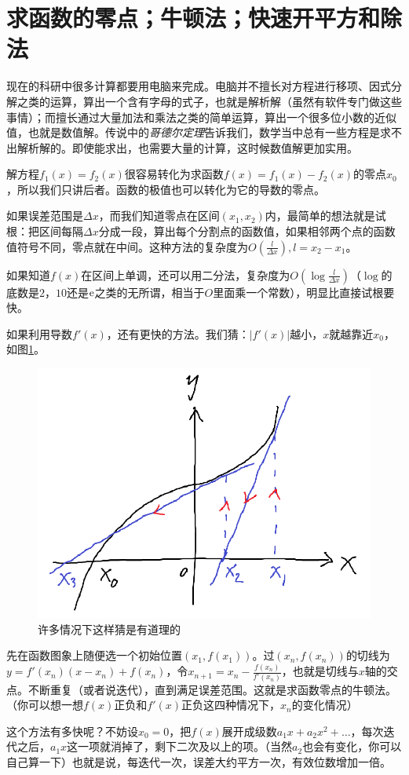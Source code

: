 \section{求函数的零点；牛顿法；快速开平方和除法}
现在的科研中很多计算都要用电脑来完成。电脑并不擅长对方程进行移项、因式分解之类的运算，算出一个含有字母的式子，也就是解析解（虽然有软件专门做这些事情）；而擅长通过大量加法和乘法之类的简单运算，算出一个很多位小数的近似值，也就是数值解。传说中的\emph{哥德尔定理}告诉我们，数学当中总有一些方程是求不出解析解的。即使能求出，也需要大量的计算，这时候数值解更加实用。

解方程$f_1(x)=f_2(x)$很容易转化为求函数$f(x)=f_1(x)-f_2(x)$的零点$x_0$，所以我们只讲后者。函数的极值也可以转化为它的导数的零点。

如果误差范围是$\Delta x$，而我们知道零点在区间$(x_1,x_2)$内，最简单的想法就是试根：把区间每隔$\Delta x$分成一段，算出每个分割点的函数值，如果相邻两个点的函数值符号不同，零点就在中间。这种方法的复杂度为$O(\frac{l}{\Delta x}),l=x_2-x_1$。

如果知道$f(x)$在区间上单调，还可以用二分法，复杂度为$O(\log \frac{l}{\Delta x})$（$\log$的底数是$2$，$10$还是$\mathrm{e}$之类的无所谓，相当于$O$里面乘一个常数），明显比直接试根要快。

如果利用导数$f'(x)$，还有更快的方法。我们猜：$|f'(x)|$越小，$x$就越靠近$x_0$，如图\ref{fig-newton-iter}。
\begin{figure}[htb]
\centering
\includegraphics[width=0.33\linewidth]{fig/newton-iter.png}
\caption{许多情况下这样猜是有道理的}
\label{fig-newton-iter}
\end{figure}

先在函数图象上随便选一个初始位置$(x_1,f(x_1))$。过$(x_n,f(x_n))$的切线为$y=f'(x_n)(x-x_n)+f(x_n)$，令$x_{n+1}=x_n-\frac{f(x_n)}{f'(x_n)}$，也就是切线与$x$轴的交点。不断重复（或者说迭代），直到满足误差范围。这就是求函数零点的牛顿法。（你可以想一想$f(x)$正负和$f'(x)$正负这四种情况下，$x_n$的变化情况）

这个方法有多快呢？不妨设$x_0=0$，把$f(x)$展开成级数$a_1 x+a_2 x^2+\dots$，每次迭代之后，$a_1 x$这一项就消掉了，剩下二次及以上的项。（当然$a_2$也会有变化，你可以自己算一下）也就是说，每迭代一次，误差大约平方一次，有效位数增加一倍。


